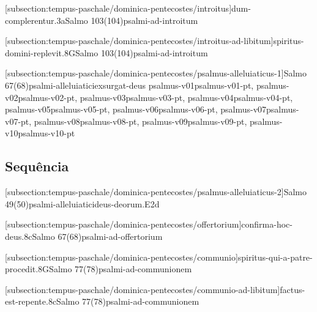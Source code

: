 \def\Prefix{subsection:tempus-paschale/dominica-pentecostes}

[\Prefix/introitus]{dum-complerentur.3a}{Salmo 103(104)}{psalmi-ad-introitum}

[\Prefix/introitus-ad-libitum]{spiritus-domini-replevit.8G}{Salmo 103(104)}{psalmi-ad-introitum}

\AllowPageFlush

[\Prefix/psalmus-alleluiaticus-1]{Salmo 67(68)}{psalmi-alleluiatici}{exsurgat-deus}{
  {psalmus-v01}{psalmus-v01-pt},
  {psalmus-v02}{psalmus-v02-pt},
  {psalmus-v03}{psalmus-v03-pt},
  {psalmus-v04}{psalmus-v04-pt},
  {psalmus-v05}{psalmus-v05-pt},
  {psalmus-v06}{psalmus-v06-pt},
  {psalmus-v07}{psalmus-v07-pt},
  {psalmus-v08}{psalmus-v08-pt},
  {psalmus-v09}{psalmus-v09-pt},
  {psalmus-v10}{psalmus-v10-pt}
}

\AllowPageFlush

\subsection{Sequência}\label{\Prefix/sequentia}

\AllowPageFlush

[\Prefix/psalmus-alleluiaticus-2]{Salmo 49(50)}{psalmi-alleluiatici}{deus-deorum.E2d}

\AllowPageFlush

[\Prefix/offertorium]{confirma-hoc-deus.8c}{Salmo 67(68)}{psalmi-ad-offertorium}

\AllowPageFlush

[\Prefix/communio]{spiritus-qui-a-patre-procedit.8G}{Salmo 77(78)}{psalmi-ad-communionem}

\AllowPageFlush

[\Prefix/communio-ad-libitum]{factus-est-repente.8c}{Salmo 77(78)}{psalmi-ad-communionem}